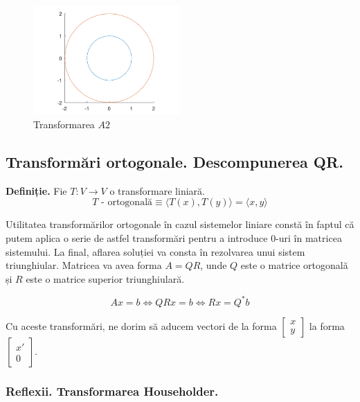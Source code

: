 \documentclass{exam}
\begin{document}
\begin{figure}[ht]
	\centering
	\includegraphics[width=0.5\textwidth]{plot4}
	\caption{Transformarea $A2$}
	\label{fig:4}
\end{figure}

\subsection{Transformări ortogonale. Descompunerea QR.}

\textbf{Definiție.} Fie $T: V \rightarrow V$ o transformare liniară.
\begin{equation*}
	T \text{ - ortogonală} \equiv \langle T(x), T(y) \rangle = \langle x, y \rangle
\end{equation*}

Utilitatea transformărilor ortogonale în cazul sistemelor liniare constă în
faptul că putem aplica o serie de astfel transformări pentru a introduce 0-uri
în matricea sistemului. La final, aflarea soluției va consta în rezolvarea unui
sistem triunghiular. Matricea va avea forma $A = QR$, unde $Q$ este o matrice
ortogonală și $R$ este o matrice superior triunghiulară.

\begin{equation*}
	Ax = b \Leftrightarrow QRx = b \Leftrightarrow Rx = Q^*b
\end{equation*}

Cu aceste transformări, ne dorim să aducem vectori de la forma
$\begin{bmatrix} x \\ y \end{bmatrix}$ la forma $\begin{bmatrix} x' \\ 0 \end{bmatrix}$.

\subsubsection{Reflexii. Transformarea Householder.}
\end{document}
